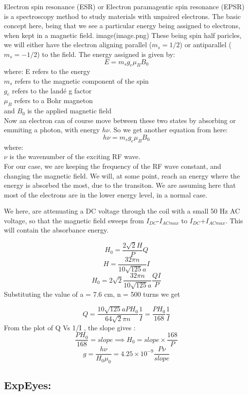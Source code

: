 \documentclass{double}
\begin{document}
Electron spin resonance (ESR) or Electron paramagentic spin resonance (EPSR) is a spectroscopy method to study materials with unpaired electrons. The basic concept here, being that we see a particular energy being assigned to electrons, when kept in a magnetic field.
image(image.png)
These being spin half paricles, we will either have the electron aligning parallel (\(m_s = 1/2\)) or antiparallel (\(m_s = -1/2\)) to the field. The energy assigned is given by:
\[ E = m_s g_e \mu_B B_0 \]
where:
E refers to the energy\\
\(m_s\) refers to the magnetic component of the spin\\
\(g_e\) refers to the landé g factor\\
\(\mu_B\) refers to a Bohr magneton\\
and \(B_0\) is the applied magnetic field\\
Now an electron can of course move between these two states by absorbing or emmiting a photon, with energy \(h\nu\). So we get another equation from here:\\
\[ h\nu=m_s g_e \mu_B B_0 \]
where:\\
\(\nu\) is the wavenumber of the exciting RF wave.\\
For our case, we are keeping the frequency of the RF wave constant, and changing the magnetic field. We will, at some point, reach an energy where the energy is absorbed the most, due to the transiton. We are assuming here that most of the electrons are in the lower energy level, in a normal case.

We here, are attenuating a DC voltage through the coil with a small 50 Hz AC voltage, so that the magnetic field sweeps from \(I_{DC}\)-\(I_{AC max}\) to \(I_{DC}\)+\(I_{AC max}\). This will contain the absorbance energy. \cite{Da_2015}

\[ H_0 = \frac{2\sqrt{2}H}{P}Q \]
\[ H=\frac{32\pi n}{10\sqrt{125}a}I \]
\[ H_0=2\sqrt{2}\frac{32\pi n}{10\sqrt{125}a}\frac{QI}{P} \]
Substituting the value of a = 7.6 cm, n = 500 turns we get

\begin{equation} Q=\frac{10\sqrt{125}a PH_0}{64\sqrt{2}\pi n }\frac{1}{I}=\frac{PH_0}{168}\frac{1}{I} \label{eq:desc}\end{equation}
From the plot of Q Vs 1/I , the slope gives :
\[ \frac{PH_0}{168}=slope \implies H_0=slope \times \frac{168}{P} \]
\[ g=\frac{h \nu}{H_0 \mu_0} = 4.25\times10^{-9} \frac{P \nu}{slope} \]

\subsection{ExpEyes:}
\end{document}
